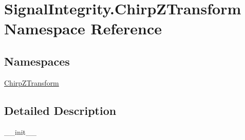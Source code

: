 \hypertarget{namespaceSignalIntegrity_1_1ChirpZTransform}{}\section{Signal\+Integrity.\+Chirp\+Z\+Transform Namespace Reference}
\label{namespaceSignalIntegrity_1_1ChirpZTransform}
\subsection*{Namespaces}
\begin{DoxyCompactItemize}
\item 
 \hyperlink{namespaceSignalIntegrity_1_1ChirpZTransform_1_1ChirpZTransform}{Chirp\+Z\+Transform}
\end{DoxyCompactItemize}


\subsection{Detailed Description}
\begin{DoxyVerb}__init__\end{DoxyVerb}
 